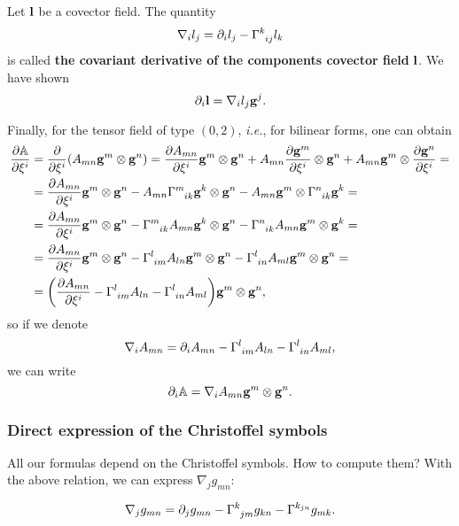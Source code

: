 \documentclass[../main.tex]{subfiles}
\begin{document}
\begin{definition}
    Let $\vb{l}$ be a covector field. The quantity
    \begin{equation}
	    \nabla_i l_j = \partial_{i}l_j - \Gamma \indices{^k_{ij}}l_k
    \end{equation}
    is called \textbf{the covariant derivative of the components covector field} $\vb{l}$. We have shown
    \[
	    \partial_{i}\vb{l} = \nabla_i l_j \vb{g}^j.
    \]
\end{definition}

Finally, for the tensor field of type $(0,2)$, \textit{i.e.}, for bilinear forms, one can obtain
\begin{align*}
	\pdv{\tensorq{A}}{\xi^i} &= \pdv{\xi^i}\qty(A_{mn} \vb{g}^m \otimes \vb{g}^n) = \pdv{A_{mn}}{\xi^i}\vb{g}^m \otimes \vb{g}^n + A_{mn}\pdv{\vb{g}^m}{\xi^i} \otimes \vb{g}^n + A_{mn}\vb{g}^m \otimes \pdv{\vb{g}^n}{\xi^i}=\\
				 &=\pdv{A_{mn}}{\xi^i}\vb{g}^m \otimes \vb{g}^n - A_{mn} \Gamma \indices{^m_{ik}}\vb{g}^k \otimes \vb{g}^n - A_{mn}\vb{g}^m \otimes \Gamma \indices{^n_{ik}} \vb{g}^k = \\
				 &= \pdv{A_{mn}}{\xi^i}\vb{g}^m \otimes \vb{g}^n - \Gamma \indices{^m_{ik}} A_{mn} \vb{g}^k \otimes \vb{g}^n - \Gamma \indices{^n_{ik}}	A_{mn}\vb{g}^m \otimes \vb{g}^k = \\
				 &= \pdv{A_{mn}}{\xi^i}\vb{g}^m \otimes \vb{g}^n - \Gamma \indices{^l_{im}}A_{ln} \vb{g}^m \otimes \vb{g}^n - \Gamma \indices{^l_{in}}A_{ml} \vb{g}^m \otimes \vb{g}^n = \\
				 &= \qty(\pdv{A_{mn}}{\xi^i} -\Gamma \indices{^l_{im}}A_{ln} - \Gamma \indices{^l_{in}}A_{ml})\vb{g}^m \otimes \vb{g}^n,
\end{align*}
so if we denote
\[
	\nabla_i A_{mn} = \partial_{i}A_{mn} - \Gamma \indices{^l_{im}}A_{ln} - \Gamma \indices{^l_{in}}A_{ml},
\]
we can write
\[
	\partial_{i}\mathbb{A} = \nabla_i A_{mn} \vb{g}^m \otimes \vb{g}^n.
\]

\subsubsection{Direct expression of the Christoffel symbols}
\label{sec:christoffel_expression}
All our formulas depend on the Christoffel symbols. How to compute them? With the above relation, we can express $\nabla_j g_{mn}$:

\[
	\nabla_j g_{mn} = \partial_{j} g_{mn} - \Gamma \indices{^k_{jm}}g_{kn} - \Gamma^{k_{jn}} g_{mk}.
\]
\end{document}
